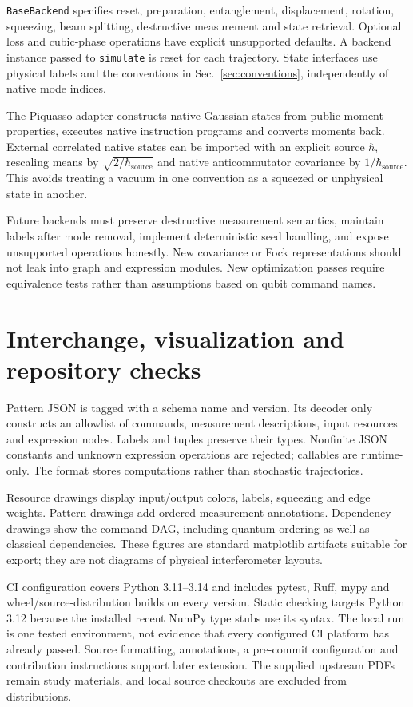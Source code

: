 \documentclass[a4paper,twocolumn,11pt,nopdfoutputerror]{quantumarticle}
\begin{document}
\texttt{BaseBackend} specifies reset, preparation, entanglement, displacement,
rotation, squeezing, beam splitting, destructive measurement and state retrieval.
Optional loss and cubic-phase operations have explicit unsupported defaults.
A backend instance passed to \texttt{simulate} is reset for each trajectory.
State interfaces use physical labels and the conventions in
Sec.~\ref{sec:conventions}, independently of native mode indices.

The Piquasso adapter constructs native Gaussian states from public moment
properties, executes native instruction programs and converts moments back.
External correlated native states can be imported with an explicit source
$\hbar$, rescaling means by $\sqrt{2/\hbar_{\mathrm{source}}}$ and native
anticommutator covariance by $1/\hbar_{\mathrm{source}}$.
This avoids treating a vacuum in one convention as a squeezed or unphysical
state in another.

Future backends must preserve destructive measurement semantics, maintain
labels after mode removal, implement deterministic seed handling, and expose
unsupported operations honestly. New covariance or Fock representations should
not leak into graph and expression modules. New optimization passes require
equivalence tests rather than assumptions based on qubit command names.

\section{Interchange, visualization and repository checks}

Pattern JSON is tagged with a schema name and version. Its decoder only constructs
an allowlist of commands, measurement descriptions, input resources and expression
nodes. Labels and tuples preserve their types. Nonfinite JSON constants and
unknown expression operations are rejected; callables are runtime-only. The
format stores computations rather than stochastic trajectories.

Resource drawings display input/output colors, labels, squeezing and edge weights.
Pattern drawings add ordered measurement annotations. Dependency drawings show
the command DAG, including quantum ordering as well as classical dependencies.
These figures are standard matplotlib artifacts suitable for export; they are
not diagrams of physical interferometer layouts.

CI configuration covers Python 3.11--3.14 and includes pytest, Ruff, mypy and
wheel/source-distribution builds on every version. Static checking targets Python 3.12 because the
installed recent NumPy type stubs use its syntax. The local run is one tested
environment, not evidence that every configured CI platform has already passed.
Source formatting, annotations, a pre-commit configuration and contribution
instructions support later extension. The supplied upstream PDFs remain study
materials, and local source checkouts are excluded from distributions.
\end{document}
